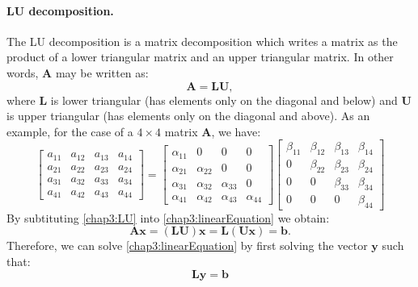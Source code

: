 \paragraph*{LU decomposition.}	\label{chap3:LUdecompo}
The LU decomposition is a matrix decomposition which writes a matrix as the product of a lower triangular matrix and an upper triangular matrix. In other words, $ \mathbf{A} $ may be written as:
\begin{equation}
\label{chap3:LU}
\mathbf{A} = \mathbf{L} \mathbf{U},
\end{equation}
where $ \mathbf{L} $ is lower triangular (has elements only on the diagonal and below) and $ \mathbf{U} $ is upper triangular (has elements only on the diagonal and above). As an example, for the case of a $ 4 \times 4 $ matrix $ \mathbf{A} $, we have:
\begin{equation}
	\begin{bmatrix}
	a_{11} & a_{12} & a_{13} & a_{14} \\
	a_{21} & a_{22} & a_{23} & a_{24} \\
	a_{31} & a_{32} & a_{33} & a_{34} \\
	a_{41} & a_{42} & a_{43} & a_{44}
	\end{bmatrix}
=
	\begin{bmatrix}
	\alpha_{11} & 0 & 0 & 0 \\
	\alpha_{21} & \alpha_{22} & 0 & 0 \\
	\alpha_{31} & \alpha_{32} & \alpha_{33} & 0 \\
	\alpha_{41} & \alpha_{42} & \alpha_{43} & \alpha_{44}
	\end{bmatrix}
	\begin{bmatrix}
	\beta_{11} & \beta_{12} & \beta_{13} & \beta_{14} \\
	0 & \beta_{22} & \beta_{23} & \beta_{24} \\
	0 & 0 & \beta_{33} & \beta_{34} \\
	0 & 0 & 0 & \beta_{44}
	\end{bmatrix}
\end{equation}
By subtituting \eqref{chap3:LU} into \eqref{chap3:linearEquation} we obtain:
\begin{equation}
\mathbf{A} \mathbf{x} = (\mathbf{L} \mathbf{U}) \mathbf{x} = \mathbf{L} (\mathbf{U} \mathbf{x}) = \mathbf{b}.
\end{equation}
Therefore, we can solve \eqref{chap3:linearEquation} by first solving the vector $ \mathbf{y} $ such that:
\begin{equation}
\label{chap3:eqLyb}
\mathbf{L} \mathbf{y} = \mathbf{b}
\end{equation}
